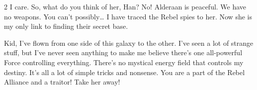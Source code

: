 \documentclass[a0,portrait]{hogent-poster}
\begin{document}
\begin{multicols}{2}
I care. So, what do you think of her, Han? No! Alderaan is peaceful. We have no weapons. You can't possibly… I have traced the Rebel spies to her. Now she is my only link to finding their secret base.

Kid, I've flown from one side of this galaxy to the other. I've seen a lot of strange stuff, but I've never seen anything to make me believe there's one all-powerful Force controlling everything. There's no mystical energy field that controls my destiny. It's all a lot of simple tricks and nonsense. You are a part of the Rebel Alliance and a traitor! Take her away! 

\end{multicols}
\end{document}
